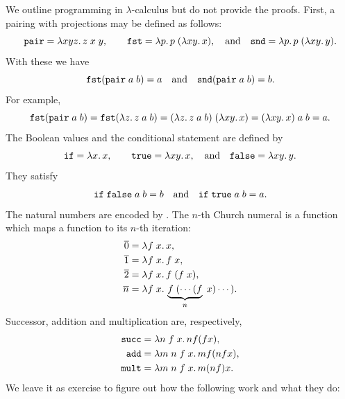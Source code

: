 We outline programming in $\lambda$-calculus but do not provide the
proofs. First, a pairing with projections may be defined as follows:
%
\begin{equation*}
  \mathtt{pair} = \lambda x y z .\,z\; x\; y,
  \qquad
  \mathtt{fst} = \lambda p .\,p \; (\lambda x y .\,x),
  \quad\text{and}\quad
  \mathtt{snd} = \lambda p .\,p \; (\lambda x y .\,y).
\end{equation*}
%
With these we have
%
\begin{equation*}
  \mathtt{fst} (\mathtt{pair}\; a\; b) = a
  \quad\text{and}\quad
  \mathtt{snd} (\mathtt{pair}\; a\; b) = b.
\end{equation*}
%
For example,
%
\begin{equation*}
  \mathtt{fst} (\mathtt{pair}\; a\; b) =
  \mathtt{fst} (\lambda z .\,z\; a\; b) =
  (\lambda z .\,z\; a\; b) \; (\lambda x y .\,x) =
  (\lambda x y .\,x) \; a \; b = a.
\end{equation*}
%
The Boolean values and the conditional statement are defined by
%
\begin{equation*}
  \mathtt{if} = \lambda x .\,x,
  \qquad
  \mathtt{true} = \lambda x y .\,x,
  \quad\text{and}\quad
  \mathtt{false} = \lambda x y .\,y.
\end{equation*}
%
They satisfy
%
\begin{equation*}
  \mathtt{if}\;\mathtt{false}\;a\;b = b
  \quad\text{and}\quad
  \mathtt{if}\;\mathtt{true}\;a\;b = a.
\end{equation*}
%
The natural numbers are encoded by . The $n$-th
Church numeral is a function which maps a function to its $n$-th
iteration:
%
\begin{align*}
  \overline{0} &= \lambda f\;x .\,x,\\
  \overline{1} &= \lambda f\;x .\,f\;x,\\
  \overline{2} &= \lambda f\;x .\,f\;(f\;x),\\
  \overline{n} &= \lambda f\;x .\,\underbrace{f\;(\cdots (f}_n\;x) \cdots).
\end{align*}
%
Successor, addition and multiplication are, respectively,
%
\begin{align*}
  \mathtt{succ} &= \lambda n\;f\;x .\,n f (f x),\\
  \mathtt{add} &= \lambda m\;n\;f\;x .\,m f (n f x),\\
  \mathtt{mult} &= \lambda m\;n\;f\;x .\,m (n f) x.
\end{align*}
%
We leave it as exercise to figure out how the following work and what
they do:

